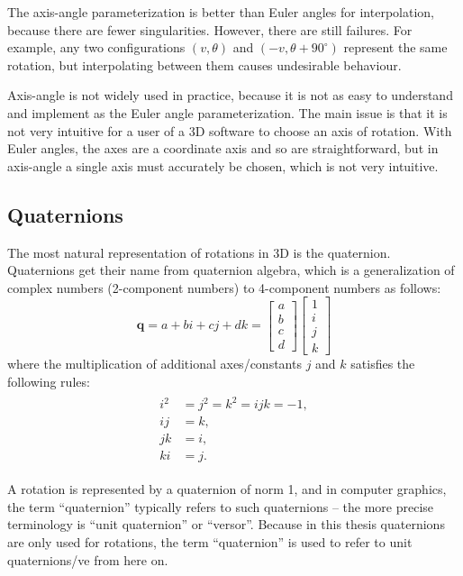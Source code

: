 The axis-angle parameterization is better than Euler angles for interpolation, because there are fewer singularities. However, there are still failures. For example, any two configurations $(v, \theta)$ and $(-v, \theta+90^\circ)$ represent the same rotation, but interpolating between them causes undesirable behaviour.

Axis-angle is not widely used in practice, because it is not as easy to understand and implement as the Euler angle parameterization. The main issue is that it is not very intuitive for a user of a 3D software to choose an axis of rotation. With Euler angles, the axes are a coordinate axis and so are straightforward, but in axis-angle a single axis must accurately be chosen, which is not very intuitive.

\subsection{Quaternions}

The most natural representation of rotations in 3D is the quaternion. Quaternions get their name from quaternion algebra, which is a generalization of complex numbers (2-component numbers) to 4-component numbers as follows:
\begin{equation}
    \mathbf{q} = a + bi + cj + dk =
    \begin{bmatrix}
        a \\
        b \\
        c \\
        d
    \end{bmatrix}
    \begin{bmatrix}
        1 \\
        i \\
        j \\
        k
    \end{bmatrix}
\end{equation}
where the multiplication of additional axes/constants $j$ and $k$ satisfies the following rules:
\begin{align}
\label{eqn:quat-def}
\begin{aligned}
    i^2 &= j^2 = k^2 = ijk = -1, \\
    ij &= k, \\
    jk &= i, \\
    ki &= j.
\end{aligned}
\end{align}

A rotation is represented by a quaternion of norm 1, and in computer graphics, the term ``quaternion'' typically refers to such quaternions -- the more precise terminology is ``unit quaternion'' or ``versor''. Because in this thesis quaternions are only used for rotations, the term ``quaternion'' is used to refer to unit quaternions/ve from here on.

